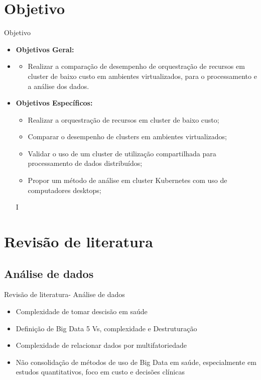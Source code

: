 \documentclass[10pt,brazil]{beamer}
\theoremstyle{definition}
\begin{document}
\section{Objetivo}
\begin{frame}{Objetivo}
  \begin{itemize}
    \item[] \textbf{Objetivos Geral:}
    \item[] 
      \begin{itemize}
        \item[] Realizar a comparação de desempenho de orquestração de recursos em cluster de baixo custo em ambientes virtualizados, para o processamento e a análise dos dados.
      \end{itemize}    
    \item[] \textbf{Objetivos Específicos:}
      \begin{itemize}
        \item Realizar a orquestração de recursos em cluster de baixo custo;
        \item Comparar o desempenho de clusters em ambientes virtualizados;
        \item Validar o uso de um cluster de utilização compartilhada para processamento de dados distribuídos;
        \item Propor um método de análise em cluster Kubernetes com uso de computadores desktops;
      \end{itemize}  
  I\end{itemize}  
\end{frame}


\section{Revisão de literatura}

\subsection{Análise de dados}

\begin{frame}{Revisão de literatura- Análise de dados}
  \begin{itemize}
    \item Complexidade de tomar descisão em saúde %
    \item Definição de Big Data 5 Vs, complexidade e Destruturação  %
    \item Complexidade de relacionar dados por multifatoriedade %
    \item Não consolidação de métodos de uso de Big Data em saúde, especialmente em estudos quantitativos, foco em custo e decisões clínicas %
  \end{itemize}
\end{frame}
\end{document}
